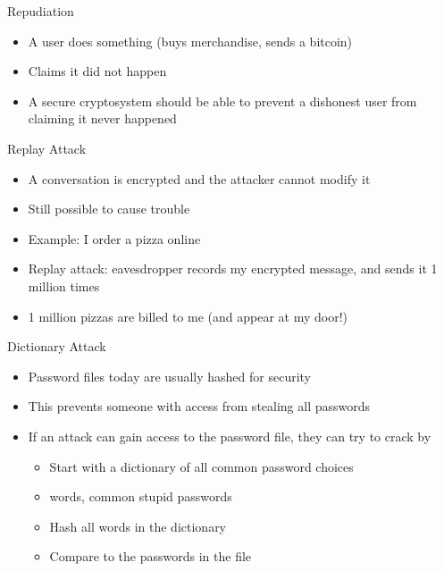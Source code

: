\begin{withoutheadline}
\begin{frame}{Repudiation}
\begin{itemize}
    \item A user does something (buys merchandise, sends a bitcoin)
    \item Claims it did not happen
    \item A secure cryptosystem should be able to prevent a dishonest user from claiming it never happened
\end{itemize}
\end{frame}

\begin{frame}{Replay Attack}
\begin{itemize}
    \item A conversation is encrypted and the attacker cannot modify it
    \item Still possible to cause trouble
    \item Example: I order a pizza online
    \item Replay attack: eavesdropper records my encrypted message, and sends it 1 million times
    \item 1 million pizzas are billed to me (and appear at my door!)
\end{itemize}
\end{frame}

\begin{frame}{Dictionary Attack}
\begin{itemize}
        \item Password files today are usually hashed for security
    \item This prevents someone with access from stealing all passwords
    \item If an attack can gain access to the password file, they can try to crack by
    \begin{itemize}
        \item Start with a dictionary of all common password choices
        \item words, common stupid passwords
        \item Hash all words in the dictionary
        \item Compare to the passwords in the file
    \end{itemize}
\end{itemize}
\end{frame}


\end{withoutheadline}
